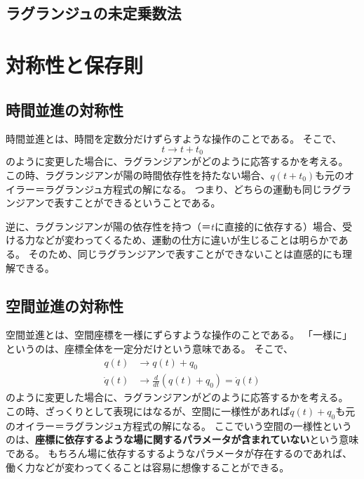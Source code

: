 \documentclass[a4paper]{jsreport}
\begin{document}
        \section{ラグランジュの未定乗数法}

    \chapter{対称性と保存則}
        \section{時間並進の対称性}
            時間並進とは、時間を定数分だけずらすような操作のことである。
            そこで、
            \begin{equation}
                t \to t + t_0
            \end{equation}
            のように変更した場合に、ラグランジアンがどのように応答するかを考える。
            この時、ラグランジアンが陽の時間依存性を持たない場合、$q(t+t_0)$も元のオイラー＝ラグランジュ方程式の解になる。
            つまり、どちらの運動も同じラグランジアンで表すことができるということである。\par
            逆に、ラグランジアンが陽の依存性を持つ（＝$t$に直接的に依存する）場合、受ける力などが変わってくるため、運動の仕方に違いが生じることは明らかである。
            そのため、同じラグランジアンで表すことができないことは直感的にも理解できる。

        \section{空間並進の対称性}
            空間並進とは、空間座標を一様にずらすような操作のことである。
            「一様に」というのは、座標全体を一定分だけという意味である。
            そこで、
            \begin{align}
                q(t) &\to q(t) + q_0 \\
                \dot{q}(t) &\to \frac{d}{dt} ({q(t)} + q_0) = \dot{q}(t)
            \end{align}
            のように変更した場合に、ラグランジアンがどのように応答するかを考える。
            この時、ざっくりとして表現にはなるが、空間に一様性があれば$q(t) + q_0$も元のオイラー＝ラグランジュ方程式の解になる。
            ここでいう空間の一様性というのは、\textbf{座標に依存するような場に関するパラメータが含まれていない}という意味である。
            もちろん場に依存するするようなパラメータが存在するのであれば、働く力などが変わってくることは容易に想像することができる。
\end{document}
